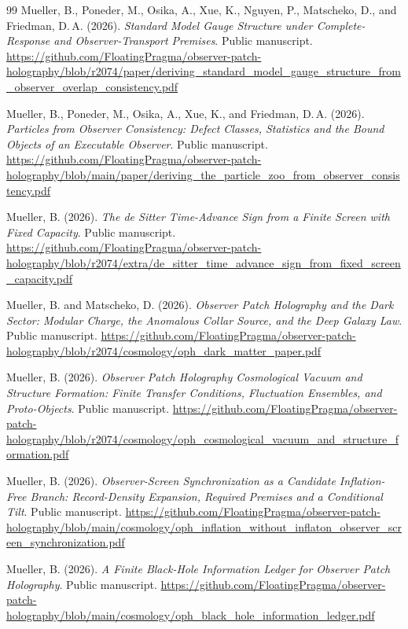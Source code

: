 \documentclass[11pt]{article}
\theoremstyle{definition}
\theoremstyle{remark}
\begin{document}
{\begin{thebibliography}{99}
Mueller, B., Poneder, M., Osika, A., Xue, K., Nguyen, P., Matscheko, D., and Friedman, D.\,A. (2026).
 \emph{Standard Model Gauge Structure under Complete-Response and Observer-Transport Premises}. Public manuscript.
\url{https://github.com/FloatingPragma/observer-patch-holography/blob/r2074/paper/deriving_standard_model_gauge_structure_from_observer_overlap_consistency.pdf}

Mueller, B., Poneder, M., Osika, A., Xue, K., and Friedman, D.\,A. (2026).
\emph{Particles from Observer Consistency: Defect Classes, Statistics and the Bound Objects of an Executable Observer}.
Public manuscript.
\url{https://github.com/FloatingPragma/observer-patch-holography/blob/main/paper/deriving_the_particle_zoo_from_observer_consistency.pdf}

Mueller, B. (2026). \emph{The de Sitter Time-Advance Sign from a Finite
Screen with Fixed Capacity}. Public manuscript.
\url{https://github.com/FloatingPragma/observer-patch-holography/blob/r2074/extra/de_sitter_time_advance_sign_from_fixed_screen_capacity.pdf}

Mueller, B. and Matscheko, D. (2026). \emph{Observer Patch Holography and the
Dark Sector: Modular Charge, the Anomalous Collar Source, and the Deep Galaxy
Law}. Public manuscript.
\url{https://github.com/FloatingPragma/observer-patch-holography/blob/r2074/cosmology/oph_dark_matter_paper.pdf}

Mueller, B. (2026). \emph{Observer Patch Holography Cosmological Vacuum and
Structure Formation: Finite Transfer Conditions, Fluctuation Ensembles, and
Proto-Objects}. Public manuscript.
\url{https://github.com/FloatingPragma/observer-patch-holography/blob/r2074/cosmology/oph_cosmological_vacuum_and_structure_formation.pdf}

Mueller, B. (2026).
\emph{Observer-Screen Synchronization as a Candidate Inflation-Free Branch: Record-Density Expansion, Required Premises and a Conditional Tilt}.
Public manuscript.
\url{https://github.com/FloatingPragma/observer-patch-holography/blob/main/cosmology/oph_inflation_without_inflaton_observer_screen_synchronization.pdf}

Mueller, B. (2026).
\emph{A Finite Black-Hole Information Ledger for Observer Patch Holography}.
Public manuscript.
\url{https://github.com/FloatingPragma/observer-patch-holography/blob/main/cosmology/oph_black_hole_information_ledger.pdf}


\end{thebibliography}}
\end{document}
